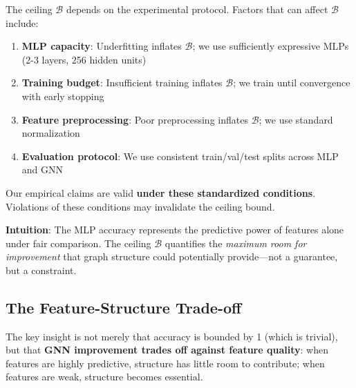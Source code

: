 \begin{remark}
\label{rem:protocol}
The ceiling $\mathcal{B}$ depends on the experimental protocol. Factors that can affect $\mathcal{B}$ include:
\begin{enumerate}
    \item \textbf{MLP capacity}: Underfitting inflates $\mathcal{B}$; we use sufficiently expressive MLPs (2-3 layers, 256 hidden units)
    \item \textbf{Training budget}: Insufficient training inflates $\mathcal{B}$; we train until convergence with early stopping
    \item \textbf{Feature preprocessing}: Poor preprocessing inflates $\mathcal{B}$; we use standard normalization
    \item \textbf{Evaluation protocol}: We use consistent train/val/test splits across MLP and GNN
\end{enumerate}
Our empirical claims are valid \textbf{under these standardized conditions}. Violations of these conditions may invalidate the ceiling bound.
\end{remark}

\textbf{Intuition}: The MLP accuracy represents the predictive power of features alone under fair comparison. The ceiling $\mathcal{B}$ quantifies the \textit{maximum room for improvement} that graph structure could potentially provide---not a guarantee, but a constraint.

\subsection{The Feature-Structure Trade-off}

The key insight is not merely that accuracy is bounded by 1 (which is trivial), but that \textbf{GNN improvement trades off against feature quality}: when features are highly predictive, structure has little room to contribute; when features are weak, structure becomes essential.

